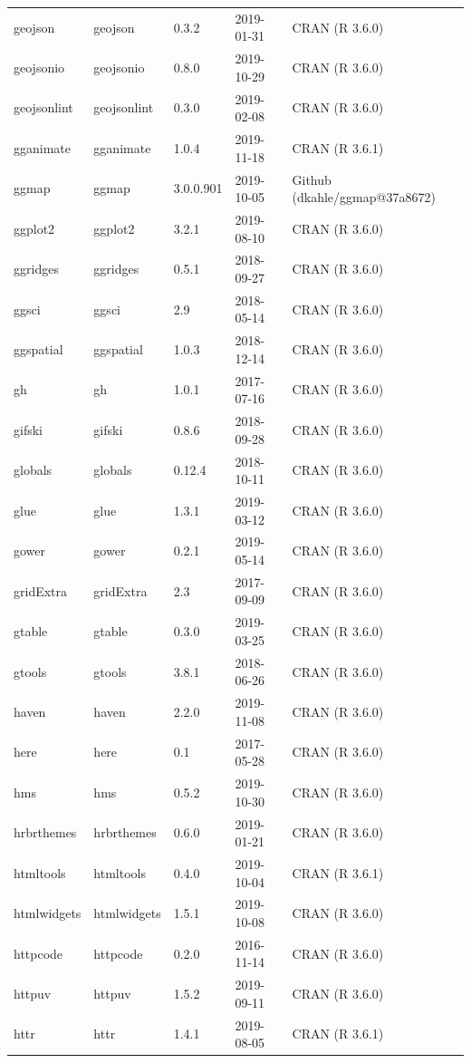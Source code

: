 \documentclass[]{article}
\begin{document}
\begin{longtable}[t]{lllll}
geojson & geojson & 0.3.2 & 2019-01-31 & CRAN (R 3.6.0)\\
geojsonio & geojsonio & 0.8.0 & 2019-10-29 & CRAN (R 3.6.0)\\
geojsonlint & geojsonlint & 0.3.0 & 2019-02-08 & CRAN (R 3.6.0)\\
gganimate & gganimate & 1.0.4 & 2019-11-18 & CRAN (R 3.6.1)\\
\addlinespace
ggmap & ggmap & 3.0.0.901 & 2019-10-05 & Github (dkahle/ggmap@37a8672)\\
ggplot2 & ggplot2 & 3.2.1 & 2019-08-10 & CRAN (R 3.6.0)\\
ggridges & ggridges & 0.5.1 & 2018-09-27 & CRAN (R 3.6.0)\\
ggsci & ggsci & 2.9 & 2018-05-14 & CRAN (R 3.6.0)\\
ggspatial & ggspatial & 1.0.3 & 2018-12-14 & CRAN (R 3.6.0)\\
\addlinespace
gh & gh & 1.0.1 & 2017-07-16 & CRAN (R 3.6.0)\\
gifski & gifski & 0.8.6 & 2018-09-28 & CRAN (R 3.6.0)\\
globals & globals & 0.12.4 & 2018-10-11 & CRAN (R 3.6.0)\\
glue & glue & 1.3.1 & 2019-03-12 & CRAN (R 3.6.0)\\
gower & gower & 0.2.1 & 2019-05-14 & CRAN (R 3.6.0)\\
\addlinespace
gridExtra & gridExtra & 2.3 & 2017-09-09 & CRAN (R 3.6.0)\\
gtable & gtable & 0.3.0 & 2019-03-25 & CRAN (R 3.6.0)\\
gtools & gtools & 3.8.1 & 2018-06-26 & CRAN (R 3.6.0)\\
haven & haven & 2.2.0 & 2019-11-08 & CRAN (R 3.6.0)\\
here & here & 0.1 & 2017-05-28 & CRAN (R 3.6.0)\\
\addlinespace
hms & hms & 0.5.2 & 2019-10-30 & CRAN (R 3.6.0)\\
hrbrthemes & hrbrthemes & 0.6.0 & 2019-01-21 & CRAN (R 3.6.0)\\
htmltools & htmltools & 0.4.0 & 2019-10-04 & CRAN (R 3.6.1)\\
htmlwidgets & htmlwidgets & 1.5.1 & 2019-10-08 & CRAN (R 3.6.0)\\
httpcode & httpcode & 0.2.0 & 2016-11-14 & CRAN (R 3.6.0)\\
\addlinespace
httpuv & httpuv & 1.5.2 & 2019-09-11 & CRAN (R 3.6.0)\\
httr & httr & 1.4.1 & 2019-08-05 & CRAN (R 3.6.1)\\

\end{longtable}
\end{document}
